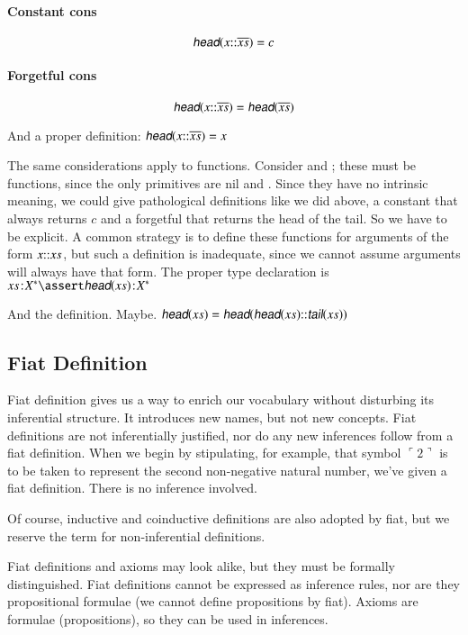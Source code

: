 \documentclass{article}
\begin{document}
\paragraph{Constant cons}
\[\head(x\cons\coseq{x}) = c\]

\paragraph{Forgetful cons}
\[\head(x\cons\coseq{x}) = \head(\coseq{x})\]

And a proper definition: \(\head(x\cons\coseq{x}) = x\)

The same considerations apply to functions. Consider \head{} and
\tail{}; these must be functions, since the only primitives are nil
and \Cons. Since they have no intrinsic meaning, we could give
pathological definitions like we did above, a constant \head{} that
always returns \(c\) and a forgetful \head{} that returns the head of
the tail. So we have to be explicit. A common strategy is to define
these functions for arguments of the form \(x{\mathpunct{::}} xs\), but such a
definition is inadequate, since we cannot assume arguments will always
have that form. The proper type declaration is
\(\tj{\seq{x}}{\List{X}} \linfer \tj{\head(\seq{x})}{\List{X}}\)

And the definition. Maybe.
\(\head(\seq{x}) = \head(\head(\seq{x})\cons\tail(\seq{x}))\)

\subsection{Fiat Definition}

Fiat definition gives us a way to enrich our vocabulary without
disturbing its inferential structure. It introduces new names, but not
new concepts. Fiat definitions are not inferentially justified, nor do
any new inferences follow from a fiat definition. When we begin by
stipulating, for example, that symbol \(\ulcorner 2\urcorner\) is to
be taken to represent the second non-negative natural number, we've
given a fiat definition. There is no inference involved.

Of course, inductive and coinductive definitions are also adopted by
fiat, but we reserve the term for non-inferential definitions.

Fiat definitions and axioms may look alike, but they must be formally
distinguished. Fiat definitions cannot be expressed as inference
rules, nor are they propositional formulae (we cannot define
propositions by fiat). Axioms are formulae (propositions), so they can
be used in inferences.
\end{document}
